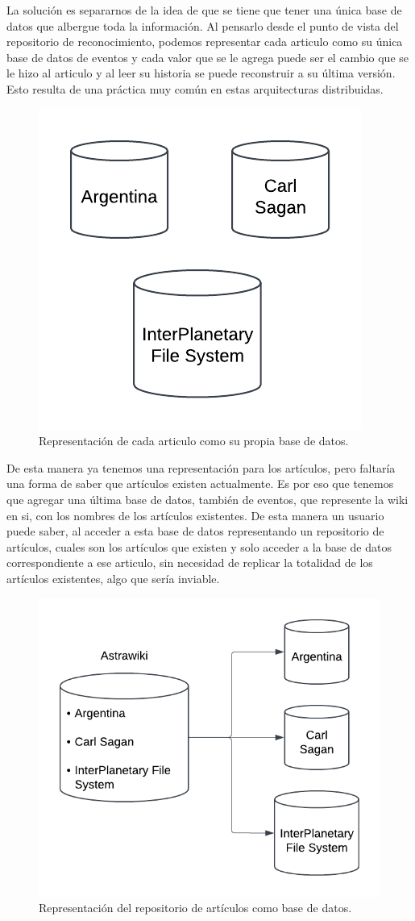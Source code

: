 La solución es separarnos de la idea de que se tiene que tener una única base de datos que albergue toda la información. Al pensarlo desde el punto de vista del repositorio de reconocimiento, podemos representar cada articulo como su única base de datos de eventos y cada valor que se le agrega puede ser el cambio que se le hizo al articulo y al leer su historia se puede reconstruir a su última versión. Esto resulta de una práctica muy común en estas arquitecturas distribuidas.

\begin{figure}[H]
    \centering
    \includegraphics[width=0.5\linewidth]{img/solucion-ipfs/bdd-articulos.png}
    \caption{Representación de cada articulo como su propia base de datos.}
    \label{fig:bdd-articulos}
\end{figure}

De esta manera ya tenemos una representación para los artículos, pero faltaría una forma de saber que artículos existen actualmente. Es por eso que tenemos que agregar una última base de datos, también de eventos, que represente la wiki en si, con los nombres de los artículos existentes. De esta manera un usuario puede saber, al acceder a esta base de datos representando un repositorio de artículos, cuales son los artículos que existen y solo acceder a la base de datos correspondiente a ese articulo, sin necesidad de replicar la totalidad de los artículos existentes, algo que sería inviable.

\begin{figure}[H]
    \centering
    \includegraphics[width=0.6\linewidth]{img/solucion-ipfs/bdd-wiki.png}
    \caption{Representación del repositorio de artículos como base de datos.}
    \label{fig:bdd-wiki}
\end{figure}

